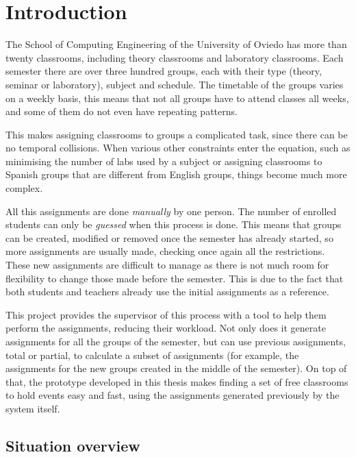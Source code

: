 \renewcommand{\documentname}{Introduction}

\chapter{Introduction}


The School of Computing Engineering of the University of Oviedo has more than twenty classrooms, including theory classrooms and laboratory classrooms. Each semester there are over three hundred groups, each with their type (theory, seminar or laboratory), subject and schedule. The timetable of the groups varies on a weekly basis, this means that not all groups have to attend classes all weeks, and some of them do not even have repeating patterns.

This makes assigning classrooms to groups a complicated task, since there can be no temporal collisions. When various other constraints enter the equation, such as minimising the number of labs used by a subject or assigning classrooms to Spanish groups that are different from English groups, things become much more complex.

All this assignments are done \textit{manually} by one person. The number of enrolled students can only be \textit{guessed} when this process is done. This means that groups can be created, modified or removed once the semester has already started, so more assignments are usually made, checking once again all the restrictions. These new assignments are difficult to manage as there is not much room for flexibility to change those made before the semester. This is due to the fact that both students and teachers already use the initial assignments as a reference.

This project provides the supervisor of this process with a tool to help them perform the assignments, reducing their workload. Not only does it generate assignments for all the groups of the semester, but can use previous assignments, total or partial, to calculate a subset of assignments (for example, the assignments for the new groups created in the middle of the semester). On top of that, the prototype developed in this thesis makes finding a set of free classrooms to hold events easy and fast, using the assignments generated previously by the system itself.


\section{Situation overview}

